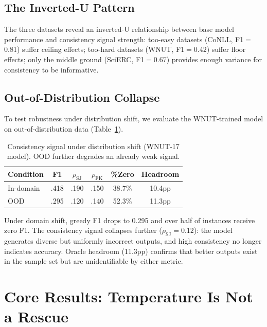\documentclass[11pt,a4paper]{article}
\begin{document}
\subsection{The Inverted-U Pattern}

The three datasets reveal an inverted-U relationship between base model performance and consistency signal strength:
too-easy datasets (CoNLL, F1$=$0.81) suffer ceiling effects; too-hard datasets (WNUT, F1$=$0.42) suffer floor effects; only the middle ground (SciERC, F1$=$0.67) provides enough variance for consistency to be informative.

\subsection{Out-of-Distribution Collapse}

To test robustness under distribution shift, we evaluate the WNUT-trained model on out-of-distribution data (Table~\ref{tab:ood}).

\begin{table}[t]
\centering
\small
\begin{tabular}{lccccc}
\toprule
\textbf{Condition} & \textbf{F1} & $\rho_{\text{SJ}}$ & $\rho_{\text{FK}}$ & \textbf{\%Zero} & \textbf{Headroom} \\
\midrule
In-domain & .418 & .190 & .150 & 38.7\% & 10.4pp \\
OOD & .295 & .120 & .140 & 52.3\% & 11.3pp \\
\bottomrule
\end{tabular}
\caption{Consistency signal under distribution shift (WNUT-17 model). OOD further degrades an already weak signal.}
\label{tab:ood}
\end{table}

Under domain shift, greedy F1 drops to 0.295 and over half of instances receive zero F1.
The consistency signal collapses further ($\rho_{\text{SJ}}{=}0.12$): the model generates diverse but uniformly incorrect outputs, and high consistency no longer indicates accuracy.
Oracle headroom (11.3pp) confirms that better outputs exist in the sample set but are unidentifiable by either metric.

\section{Core Results: Temperature Is Not a Rescue}
\label{sec:temperature}
\end{document}
